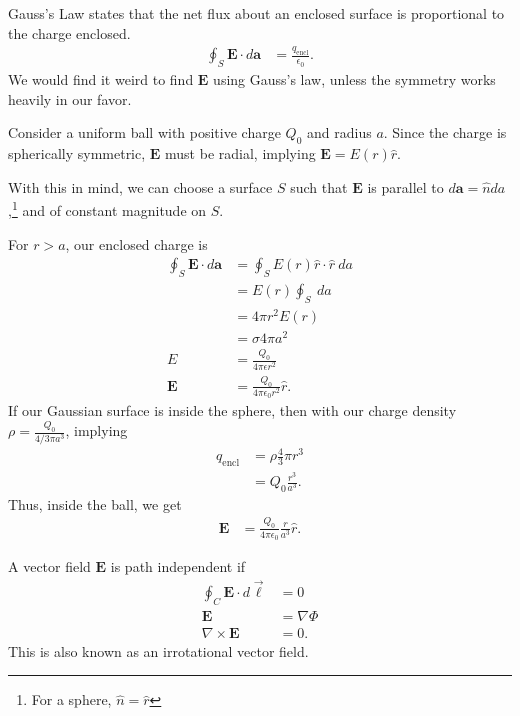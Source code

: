 \documentclass[10pt]{mypackage}
\begin{document}
\begin{example}
  Gauss's Law states that the net flux about an enclosed surface is proportional to the charge enclosed.
  \begin{align*}
    \oint_{S}^{} \mathbf{E}\cdot d\mathbf{a} &= \frac{q_{\text{encl}}}{\epsilon_{0}}.
  \end{align*}
  We would find it weird to find $\mathbf{E}$ using Gauss's law, unless the symmetry works heavily in our favor.\newline

  Consider a uniform ball with positive charge $Q_0$ and radius $a$. Since the charge is spherically symmetric, $\mathbf{E}$ must be radial, implying $\mathbf{E} = E(r)\hat{r}$.\newline

  With this in mind, we can choose a surface $S$ such that $\mathbf{E}$ is parallel to $d\mathbf{a} = \hat{n} da$,\footnote{For a sphere, $\hat{n} = \hat{r}$} and of constant magnitude on $S$.\newline

  For $r > a$, our enclosed charge is
  \begin{align*}
    \oint_{S}\mathbf{E}\cdot d\mathbf{a} &= \oint_{S}E(r)\hat{r}\cdot \hat{r}\:da\\
                                         &= E(r)\oint_{S}\:da\\
                                         &= 4\pi r^2 E(r)\\
                                         &= \sigma 4\pi a^2\\
    E &= \frac{Q_0}{4\pi \epsilon r^2}\\
    \mathbf{E} &= \frac{Q_0}{4\pi \epsilon_0 r^2}\hat{r}.
  \end{align*}
  If our Gaussian surface is inside the sphere, then with our charge density $\rho = \frac{Q_0}{4/3 \pi a^3}$, implying
  \begin{align*}
    q_{\text{encl}} &= \rho \frac{4}{3}\pi r^3\\
                    &= Q_0\frac{r^3}{a^3}.
  \end{align*}
  Thus, inside the ball, we get
  \begin{align*}
    \mathbf{E} &= \frac{Q_0}{4\pi \epsilon_0}\frac{r}{a^3}\hat{r}.
  \end{align*}
\end{example}
\begin{recall}
  A vector field $\mathbf{E}$ is path independent if
  \begin{align*}
    \oint_{C} \mathbf{E}\cdot d\vec{\ell} &= 0\\
    \mathbf{E} &= \nabla \Phi\\
    \nabla \times \mathbf{E} &= 0.
  \end{align*}
  This is also known as an irrotational vector field.
\end{recall}
\end{document}
